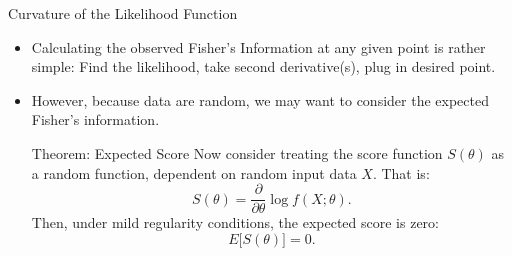\begin{frame}[allowframebreaks]{Curvature of the Likelihood Function}
\begin{itemize}
\begin{exampleblock}{Observed Fisher's information, Normal Distribution}
{\begin{proof}
    The score function is the partial derivative of $\ell(\theta)$, with respect to $\theta$:
    $$
    S(\theta) = \frac{\partial}{\partial \theta} \ell(\theta) = \frac{1}{\sigma^2}\sum_{i = 1}^n (x_i^* - \theta).
    $$

    Setting equal to zero, solving for $\theta$, results in the MLE:
    $$
    \hat{\theta} = \bar{x}^*_n.
    $$

    Taking the negative second derivative gives the observed Fisher information:
    $$
    I(\theta) = \frac{n}{\sigma^2}.
    $$

    Note that this is a constant with respect to $\theta$, so we have:
    $$
    I(\hat{\theta}) = I(\theta) = \frac{n}{\sigma^2}.
    $$
    \alert{Note:} In this example, note the relationship between $I(\hat{\theta})$ and $\Var(\hat{\theta})$, where we treat the data $X$ as random.
    This will come into play later:
    \begin{align*}
    \Var(\hat{\theta}) &= \Var(\bar{X}_n) \\
    &= \frac{1}{n^2}\Var\Big(\sum_{i = 1}^n X_i\Big) \\
    &= \frac{\sigma^2}{n} \\
    &= \frac{1}{I(\hat{\theta})}.
    \end{align*}
    Later, we'll show that for any general MLE estimator:
    $$
    \Var(\hat{\theta}) \approx \frac{1}{I(\hat{\theta})}.
    $$
    This is a common theme: something that is exactly true in the normal case is approximately elsewhere. This is particularly true if the estimates are ``regular", meaning they behave approximately like a normal distribution.
  \end{proof}
  }

\end{exampleblock}

  \framebreak

  \item Calculating the observed Fisher's Information at any given point is rather simple: Find the likelihood, take second derivative(s), plug in desired point.
  \item However, because data are random, we may want to consider the \alert{expected} Fisher's information.

  \begin{block}{Theorem: Expected Score}
    Now consider treating the score function $S(\theta)$ as a random function, dependent on random input data $X$. That is:
    $$
    S(\theta) = \frac{\partial}{\partial \theta} \log f(X; \theta).
    $$
    Then, under mild regularity conditions, the expected score is zero:
    $$
    E\big[S(\theta)\big] = 0.
    $$


\end{block}
\end{itemize}
\end{frame}
